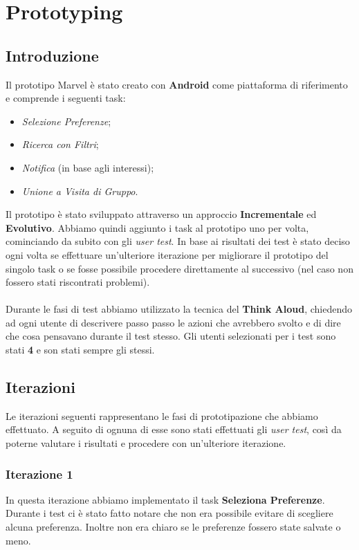 \section{Prototyping}

\subsection{Introduzione}
Il prototipo Marvel è stato creato con \textbf{Android} come piattaforma di riferimento e comprende i seguenti task:
\begin{itemize}
    \item \textit{Selezione  Preferenze};
    \item \textit{Ricerca con Filtri};
    \item \textit{Notifica} (in base agli interessi);
    \item \textit{Unione a Visita di Gruppo}.
\end{itemize}

Il prototipo è stato sviluppato attraverso un approccio \textbf{Incrementale} ed \textbf{Evolutivo}. Abbiamo quindi aggiunto i task al prototipo uno per volta, cominciando da subito con gli \textit{user test}. In base ai risultati dei test è stato deciso ogni volta se effettuare un'ulteriore iterazione per migliorare il prototipo del singolo task o se fosse possibile procedere direttamente al successivo (nel caso non fossero stati riscontrati problemi). 

\paragraph{}
Durante le fasi di test abbiamo utilizzato la tecnica del \textbf{Think Aloud}, chiedendo ad ogni utente di descrivere passo passo le azioni che avrebbero svolto e di dire che cosa pensavano durante il test stesso.
Gli utenti selezionati per i test sono stati \textbf{4} e son stati sempre gli stessi.

\subsection{Iterazioni}
Le iterazioni seguenti rappresentano le fasi di prototipazione che abbiamo effettuato. A seguito di ognuna di esse sono stati effettuati gli \textit{user test}, così da poterne valutare i risultati e procedere con un'ulteriore iterazione.

\subsubsection{Iterazione 1}
In questa iterazione abbiamo implementato il task \textbf{Seleziona Preferenze}. Durante i test ci è stato fatto notare che non era possibile evitare di scegliere alcuna preferenza. Inoltre non era chiaro se le preferenze fossero state salvate o meno.

